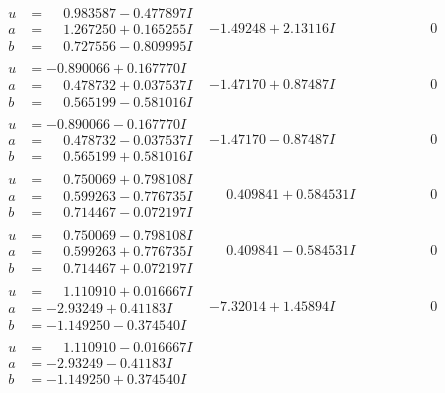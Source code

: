 \documentclass[1p]{elsarticle_modified}
\theoremstyle{definition}
\begin{document}
$$\begin{array}{c|c|c}
\begin{aligned}
u &= \phantom{-}0.983587 - 0.477897 I \\
a &= \phantom{-}1.267250 + 0.165255 I \\
b &= \phantom{-}0.727556 - 0.809995 I\end{aligned}
 & -1.49248 + 2.13116 I & \phantom{-0.000000 } 0 \\ \hline\begin{aligned}
u &= -0.890066 + 0.167770 I \\
a &= \phantom{-}0.478732 + 0.037537 I \\
b &= \phantom{-}0.565199 - 0.581016 I\end{aligned}
 & -1.47170 + 0.87487 I & \phantom{-0.000000 } 0 \\ \hline\begin{aligned}
u &= -0.890066 - 0.167770 I \\
a &= \phantom{-}0.478732 - 0.037537 I \\
b &= \phantom{-}0.565199 + 0.581016 I\end{aligned}
 & -1.47170 - 0.87487 I & \phantom{-0.000000 } 0 \\ \hline\begin{aligned}
u &= \phantom{-}0.750069 + 0.798108 I \\
a &= \phantom{-}0.599263 - 0.776735 I \\
b &= \phantom{-}0.714467 - 0.072197 I\end{aligned}
 & \phantom{-}0.409841 + 0.584531 I & \phantom{-0.000000 } 0 \\ \hline\begin{aligned}
u &= \phantom{-}0.750069 - 0.798108 I \\
a &= \phantom{-}0.599263 + 0.776735 I \\
b &= \phantom{-}0.714467 + 0.072197 I\end{aligned}
 & \phantom{-}0.409841 - 0.584531 I & \phantom{-0.000000 } 0 \\ \hline\begin{aligned}
u &= \phantom{-}1.110910 + 0.016667 I \\
a &= -2.93249 + 0.41183 I \\
b &= -1.149250 - 0.374540 I\end{aligned}
 & -7.32014 + 1.45894 I & \phantom{-0.000000 } 0 \\ \hline\begin{aligned}
u &= \phantom{-}1.110910 - 0.016667 I \\
a &= -2.93249 - 0.41183 I \\
b &= -1.149250 + 0.374540 I\end{aligned}

\end{array}$$
\end{document}
